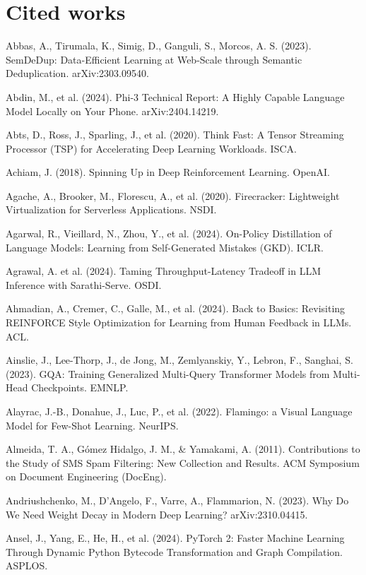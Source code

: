 \section*{Cited works}
{\small
\begin{enumerate}[leftmargin=*,itemsep=1pt,label={[\arabic*]}]
\item Abbas, A., Tirumala, K., Simig, D., Ganguli, S., Morcos, A. S. (2023). SemDeDup: Data-Efficient Learning at Web-Scale through Semantic Deduplication. arXiv:2303.09540.
\item Abdin, M., et al. (2024). Phi-3 Technical Report: A Highly Capable Language Model Locally on Your Phone. arXiv:2404.14219.
\item Abts, D., Ross, J., Sparling, J., et al. (2020). Think Fast: A Tensor Streaming Processor (TSP) for Accelerating Deep Learning Workloads. ISCA.
\item Achiam, J. (2018). Spinning Up in Deep Reinforcement Learning. OpenAI.
\item Agache, A., Brooker, M., Florescu, A., et al. (2020). Firecracker: Lightweight Virtualization for Serverless Applications. NSDI.
\item Agarwal, R., Vieillard, N., Zhou, Y., et al. (2024). On-Policy Distillation of Language Models: Learning from Self-Generated Mistakes (GKD). ICLR.
\item Agrawal, A. et al. (2024). Taming Throughput-Latency Tradeoff in LLM Inference with Sarathi-Serve. OSDI.
\item Ahmadian, A., Cremer, C., Galle, M., et al. (2024). Back to Basics: Revisiting REINFORCE Style Optimization for Learning from Human Feedback in LLMs. ACL.
\item Ainslie, J., Lee-Thorp, J., de Jong, M., Zemlyanskiy, Y., Lebron, F., Sanghai, S. (2023). GQA: Training Generalized Multi-Query Transformer Models from Multi-Head Checkpoints. EMNLP.
\item Alayrac, J.-B., Donahue, J., Luc, P., et al. (2022). Flamingo: a Visual Language Model for Few-Shot Learning. NeurIPS.
\item Almeida, T. A., Gómez Hidalgo, J. M., \& Yamakami, A. (2011). Contributions to the Study of SMS Spam Filtering: New Collection and Results. ACM Symposium on Document Engineering (DocEng).
\item Andriushchenko, M., D'Angelo, F., Varre, A., Flammarion, N. (2023). Why Do We Need Weight Decay in Modern Deep Learning? arXiv:2310.04415.
\item Ansel, J., Yang, E., He, H., et al. (2024). PyTorch 2: Faster Machine Learning Through Dynamic Python Bytecode Transformation and Graph Compilation. ASPLOS.

\end{enumerate}}
